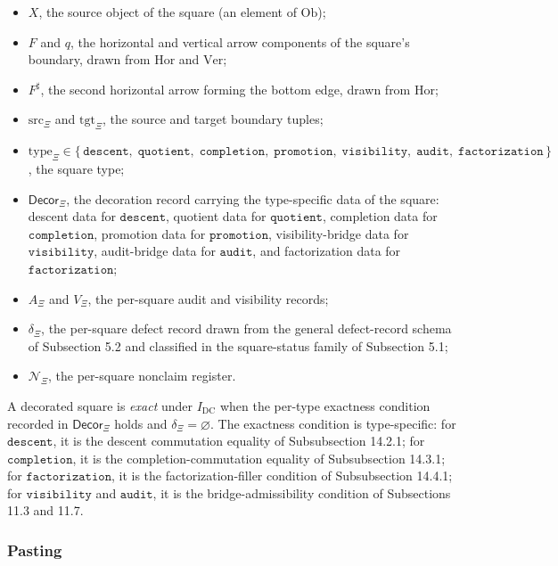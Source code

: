 \documentclass[11pt]{article}
\providecommand{\tightlist}{}
\theoremstyle{definition}
\begin{document}
\begin{itemize}
\tightlist
\item
  \(X\), the source object of the square (an element of \(\mathrm{Ob}\));
\item
  \(F\) and \(q\), the horizontal and vertical arrow components of the square's boundary, drawn from \(\mathrm{Hor}\) and \(\mathrm{Ver}\);
\item
  \(F^{\sharp}\), the second horizontal arrow forming the bottom edge, drawn from \(\mathrm{Hor}\);
\item
  \(\mathrm{src}_{\Xi}\) and \(\mathrm{tgt}_{\Xi}\), the source and target boundary tuples;
\item
  \(\mathrm{type}_{\Xi}\in\{\,\texttt{descent},\;\texttt{quotient},\;\texttt{completion},\;\texttt{promotion},\;\texttt{visibility},\;\texttt{audit},\;\texttt{factorization}\,\}\), the square type;
\item
  \(\mathsf{Decor}_{\Xi}\), the decoration record carrying the type-specific data of the square: descent data for \(\texttt{descent}\), quotient data for \(\texttt{quotient}\), completion data for \(\texttt{completion}\), promotion data for \(\texttt{promotion}\), visibility-bridge data for \(\texttt{visibility}\), audit-bridge data for \(\texttt{audit}\), and factorization data for \(\texttt{factorization}\);
\item
  \(A_{\Xi}\) and \(V_{\Xi}\), the per-square audit and visibility records;
\item
  \(\delta_{\Xi}\), the per-square defect record drawn from the general defect-record schema of Subsection 5.2 and classified in the square-status family of Subsection 5.1;
\item
  \(\mathcal N_{\Xi}\), the per-square nonclaim register.
\end{itemize}

A decorated square is \emph{exact} under \(I_{\mathrm{DC}}\) when the per-type exactness condition recorded in \(\mathsf{Decor}_{\Xi}\) holds and \(\delta_{\Xi}=\varnothing\). The exactness condition is type-specific: for \(\texttt{descent}\), it is the descent commutation equality of Subsubsection 14.2.1; for \(\texttt{completion}\), it is the completion-commutation equality of Subsubsection 14.3.1; for \(\texttt{factorization}\), it is the factorization-filler condition of Subsubsection 14.4.1; for \(\texttt{visibility}\) and \(\texttt{audit}\), it is the bridge-admissibility condition of Subsections 11.3 and 11.7.

\subsubsection{Pasting}
\end{document}
